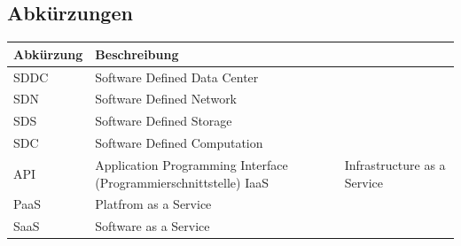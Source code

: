 \documentclass[11pt]{scrartcl}
\begin{document}
\subsection{Abkürzungen}
\begin{tabularx}{\linewidth}{l | X}
    \textbf{Abkürzung} & \textbf{Beschreibung}\\
    \hline
    SDDC & Software Defined Data Center\\
    \hline
    SDN & Software Defined Network\\
    \hline
    SDS & Software Defined Storage\\
    \hline
    SDC & Software Defined Computation\\
    \hline
    API & Application Programming Interface (Programmierschnittstelle)
    \hline
    IaaS & Infrastructure as a Service\\
    \hline
    PaaS & Platfrom as a Service\\
    \hline
    SaaS & Software as a Service\\
\end{tabularx}
\end{document}
